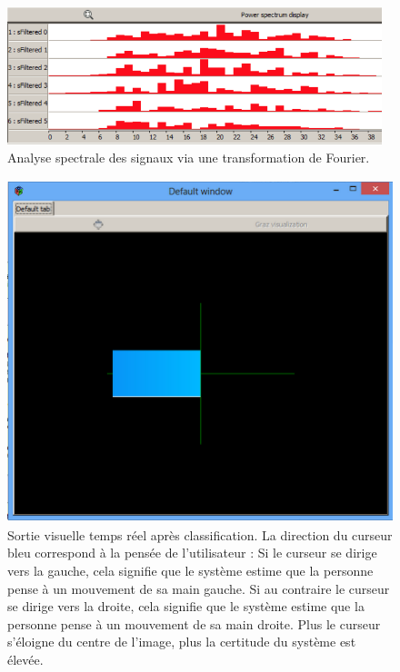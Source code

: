 \begin{figure}[h]
	\centering\includegraphics[height=4cm]{images/xpPowerSpectrum.png}
	\caption[Analyse spectrale des signaux]{Analyse spectrale des signaux via une transformation de Fourier.}
	\label{xpPowerSpectrum}
\end{figure}

\newpage
\begin{figure}[h]
	\centering\includegraphics[height=10cm]{images/online.png}
	\caption[Sortie visuelle temps réel après classification]{Sortie visuelle temps réel après classification. La direction du curseur bleu correspond à la pensée de l'utilisateur : Si le curseur se dirige vers la gauche, cela signifie que le système estime que la personne pense à un mouvement de sa main gauche. Si au contraire le curseur se dirige vers la droite, cela signifie que le système estime que la personne pense à un mouvement de sa main droite. Plus le curseur s'éloigne du centre de l'image, plus la certitude du système est élevée.}
	\label{online}
\end{figure}